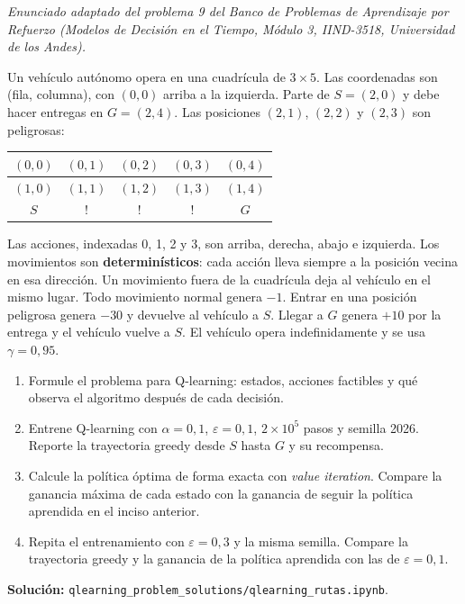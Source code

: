 \noindent\textit{Enunciado adaptado del problema 9 del Banco de Problemas de Aprendizaje por Refuerzo (Modelos de Decisión en el Tiempo, Módulo 3, IIND-3518, Universidad de los Andes).}

\bigskip

\noindent Un vehículo autónomo opera en una cuadrícula de $3 \times 5$. Las coordenadas son (fila, columna), con $(0,0)$ arriba a la izquierda. Parte de $S = (2,0)$ y debe hacer entregas en $G = (2,4)$. Las posiciones $(2,1)$, $(2,2)$ y $(2,3)$ son peligrosas:

\begin{table}[H]
\centering
\renewcommand{\arraystretch}{1.3}
\begin{tabular}{|c|c|c|c|c|}
\hline
$(0,0)$ & $(0,1)$ & $(0,2)$ & $(0,3)$ & $(0,4)$\\
\hline
$(1,0)$ & $(1,1)$ & $(1,2)$ & $(1,3)$ & $(1,4)$\\
\hline
$S$ & ! & ! & ! & $G$\\
\hline
\end{tabular}
\end{table}

\noindent Las acciones, indexadas 0, 1, 2 y 3, son arriba, derecha, abajo e izquierda. Los movimientos son \textbf{determinísticos}: cada acción lleva siempre a la posición vecina en esa dirección. Un movimiento fuera de la cuadrícula deja al vehículo en el mismo lugar. Todo movimiento normal genera $-1$. Entrar en una posición peligrosa genera $-30$ y devuelve al vehículo a $S$. Llegar a $G$ genera $+10$ por la entrega y el vehículo vuelve a $S$. El vehículo opera indefinidamente y se usa $\gamma = 0{,}95$.

\begin{enumerate}
\item Formule el problema para Q-learning: estados, acciones factibles y qué observa el algoritmo después de cada decisión.
\item Entrene Q-learning con $\alpha = 0{,}1$, $\varepsilon = 0{,}1$, $2 \times 10^5$ pasos y semilla 2026. Reporte la trayectoria greedy desde $S$ hasta $G$ y su recompensa.
\item Calcule la política óptima de forma exacta con \emph{value iteration}. Compare la ganancia máxima de cada estado con la ganancia de seguir la política aprendida en el inciso anterior.
\item Repita el entrenamiento con $\varepsilon = 0{,}3$ y la misma semilla. Compare la trayectoria greedy y la ganancia de la política aprendida con las de $\varepsilon = 0{,}1$.
\end{enumerate}

\noindent\textbf{Solución:} \texttt{qlearning\_problem\_solutions/qlearning\_rutas.ipynb}.
